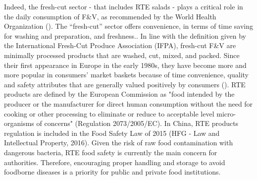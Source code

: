 \documentclass[a4,12pt]{article}
\begin{document}
Indeed, the fresh-cut sector - that includes RTE salads - plays a critical role in  the daily consumption of F&V, as recommended by the World Health Organization (\cite{WHO}). The “fresh-cut” sector offers convenience, in terms of time saving for washing and preparation, and freshness.. In line with the definition given by the International Fresh-Cut Produce Association (IFPA), fresh-cut F&V are minimally processed products that are washed, cut, mixed, and packed. Since their first appearance in Europe in the early 1980s, they have become more and more popular in consumers’ market baskets because of time convenience, quality and safety attributes that are generally valued positively by consumers (\cite{Artes}). RTE products are defined by the European Commission as  "food intended by the producer or the manufacturer for direct human consumption without the need for cooking or other processing to eliminate or reduce to acceptable level micro-organisms of concerns" (Regulation 2073/2005/EC). In China, RTE products regulation is included in the Food Safety Law of 2015 (HFG - Law and Intellectual Property, 2016). Given the risk of raw food contamination with dangerous bacteria, RTE food safety is currently the main concern for authorities. Therefore, encouraging proper handling and storage to avoid foodborne diseases is a priority for public and private food institutions.



%
\end{document}
